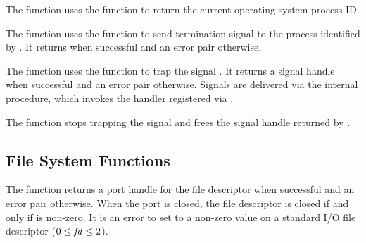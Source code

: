 The  function uses the 
function to return the current operating-system process ID.

\begin{function}
\end{function}

The  function uses the  function to
send termination signal  to the process identified by
. It returns  when successful and an error pair
otherwise.

\begin{function}
\end{function}

The  function uses the 
function to trap the signal .
It returns a signal handle when successful and an error pair
otherwise.
Signals are delivered via the internal  procedure, which
invokes the handler registered via .

\begin{function}
\end{function}

The  function stops trapping the signal
and frees the signal handle returned by .

\subsection {File System Functions}

\begin{function}
\end{function}

The  function returns a port handle for the file
descriptor  when successful and an error pair otherwise. When
the port is closed, the file descriptor  is closed if and only
if  is non-zero. It is an error to set  to a
non-zero value on a standard I/O file descriptor ($0 \le \var{fd} \le
2$).

\begin{function}
\end{function}

